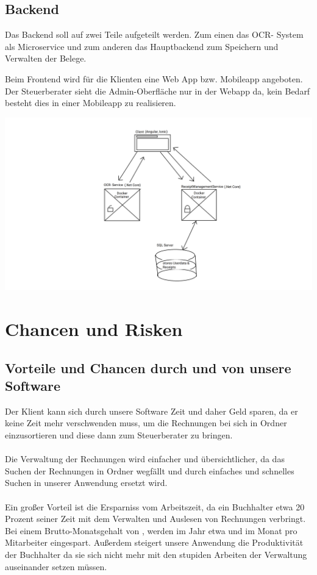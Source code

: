 \documentclass[12pt]{article}
\theoremstyle{definition}
\newcommand*{\skippingparagraph}{\par\vspace{\baselineskip}\noindent}
\begin{document}
\pagebreak
\subsection{Backend}
Das Backend soll auf zwei Teile aufgeteilt werden. Zum einen das OCR- System als Microservice und zum anderen das Hauptbackend zum Speichern und Verwalten der Belege.
\skippingparagraph
Beim Frontend wird für die Klienten eine Web App bzw. Mobileapp angeboten. Der Steuerberater sieht die Admin-Oberfläche nur in der Webapp da, kein Bedarf besteht dies in einer Mobileapp zu realisieren.

\includegraphics[width=\linewidth,trim=130mm 10mm 100mm 10mm, clip]{SystemConcept}
\pagebreak


\section{Chancen und Risken}

\subsection{Vorteile und Chancen durch und von unsere Software}

Der Klient kann sich durch unsere Software Zeit und daher Geld sparen, da er keine Zeit mehr verschwenden muss, um die Rechnungen bei sich in Ordner einzusortieren und diese dann zum Steuerberater zu bringen.\\ \\
Die Verwaltung der Rechnungen wird einfacher und übersichtlicher, da das Suchen der Rechnungen in Ordner wegfällt und durch einfaches und schnelles Suchen in unserer Anwendung ersetzt wird.\\ \\
Ein großer Vorteil ist die Ersparniss vom Arbeitszeit, da ein Buchhalter etwa 20 Prozent seiner Zeit mit dem Verwalten und Auslesen von Rechnungen verbringt. Bei einem Brutto-Monatsgehalt von , werden im Jahr etwa  und im Monat  pro Mitarbeiter eingespart. Außerdem steigert unsere Anwendung die Produktivität der Buchhalter da sie sich nicht mehr mit den stupiden Arbeiten der Verwaltung auseinander setzen müssen.\\
\end{document}
